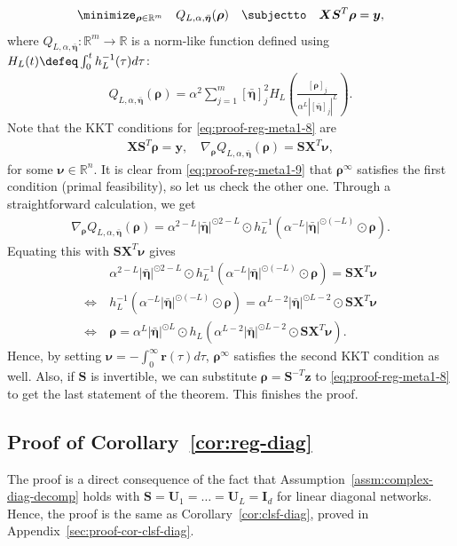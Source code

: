 \documentclass{article} %
\def\vr{{\bm{r}}}
\def\vy{{\bm{y}}}
\def\vz{{\bm{z}}}
\def\mI{{\bm{I}}}
\def\mS{{\bm{S}}}
\def\mU{{\bm{U}}}
\def\mX{{\bm{X}}}
\newcommand{\R}{\mathbb{R}}
\newcommand{\vrho}{{\bm{\rho}}}
\newcommand{\veta}{{\bm{\eta}}}
\newcommand{\vnu}{{\bm{\nu}}}
\begin{document}
\begin{align}
\label{eq:proof-reg-meta1-8}
    \minimize_{\vrho \in \R^m}\quad Q_{L, \alpha, \bar \veta}(\vrho)
    \quad
    \subjectto \quad \mX \mS^T \vrho= \vy,
\end{align}
where $Q_{L, \alpha, \bar \veta} : \R^m \to \R$ is a norm-like function  defined using $H_L (t) \defeq \int_0^t h_L^{-1} (\tau) d\tau$:
\begin{align*}
    Q_{L, \alpha, \bar \veta}(\vrho) = \alpha^2  \sum_{j=1}^m [\bar \veta]_j^2 H_L \left ( 
    \frac{[\vrho]_j}{\alpha^L |[\bar \veta]_j|^L}
    \right ).
\end{align*}
Note that the KKT conditions for \eqref{eq:proof-reg-meta1-8} are
\begin{align*}
    \mX \mS^T \vrho = \vy, \quad \nabla_\vrho Q_{L, \alpha, \bar \veta}(\vrho) = \mS \mX^T \vnu,
\end{align*}
for some $\vnu \in \R^n$. It is clear from \eqref{eq:proof-reg-meta1-9} that $\vrho^\infty$ satisfies the first condition (primal feasibility), so let us check the other one.
Through a straightforward calculation, we get
\begin{align*}
    \nabla_\vrho Q_{L, \alpha, \bar \veta}(\vrho)
    = \alpha^{2-L} |\bar \veta|^{\odot 2-L} \odot
    h_L^{-1} \left ( \alpha^{-L} |\bar \veta|^{\odot (-L)} \odot \vrho \right ).
\end{align*}
Equating this with $\mS \mX^T \vnu$ gives
\begin{align*}
    &\alpha^{2-L} |\bar \veta|^{\odot 2-L} \odot
    h_L^{-1} \left ( \alpha^{-L} |\bar \veta|^{\odot(-L)} \odot \vrho \right ) = \mS \mX^T \vnu\\
    \iff~&
    h_L^{-1} \left ( \alpha^{-L} |\bar \veta|^{\odot(-L)} \odot \vrho \right )
    = \alpha^{L-2} |\bar \veta|^{\odot L-2} \odot \mS \mX^T \vnu\\
    \iff~&\vrho = \alpha^L |\bar \veta|^{\odot L} \odot
    h_L \left ( \alpha^{L-2} |\bar \veta|^{\odot L-2} \odot \mS \mX^T \vnu \right ).
\end{align*}
Hence, by setting $\vnu = - \int_0^\infty \vr(\tau) d\tau$, $\vrho^\infty$ satisfies the second KKT condition as well.
Also, if $\mS$ is invertible, we can substitute $\vrho = \mS^{-T} \vz$ to \eqref{eq:proof-reg-meta1-8} to get the last statement of the theorem.
This finishes the proof.


\subsection{Proof of Corollary~\ref{cor:reg-diag}}
The proof is a direct consequence of the fact that Assumption~\ref{assm:complex-diag-decomp} holds with $\mS = \mU_1 = \dots = \mU_L = \mI_d$ for linear diagonal networks. Hence, the proof is the same as Corollary~\ref{cor:clsf-diag}, proved in Appendix~\ref{sec:proof-cor-clsf-diag}.
\end{document}
